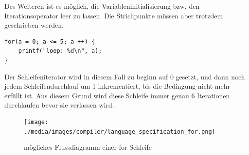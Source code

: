 Des Weiteren ist es m\"oglich, die Variableninitialisierung bzw. den Iterationsoperator leer zu lassen. Die Strichpunkte m\"ussen aber trotzdem geschrieben werden.


\begin{lstlisting}[language=CMM]
for(a = 0; a <= 5; a ++) {
	printf("loop: %d\n", a);
}
\end{lstlisting}

Der Schleifeniterator wird in diesem Fall zu beginn auf 0 gesetzt, und dann nach jedem Schleifendurchlauf um 1 inkrementiert, bis die Bedingung nicht mehr erf\"ullt ist. Aus diesem Grund wird diese Schleife immer genau 6 Iterationen durchlaufen bevor sie verlassen wird. 

\begin{figure}[h]
\centering
\texttt{[image: ./media/images/compiler/language\_specification\_for.png]}
\caption{m\"ogliches Flussdiagramm einer for Schleife}
\label{language_specification_for}
\end{figure}